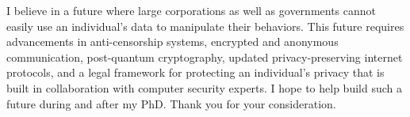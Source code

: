 \documentclass{article}
\begin{document}
I believe in a future where large corporations as well as governments cannot easily use an individual's data to manipulate their behaviors. This future requires advancements in anti-censorship systems, encrypted and anonymous communication, post-quantum cryptography, updated privacy-preserving internet protocols, and a legal framework for protecting an individual's privacy that is built in collaboration with computer security experts. I hope to help build such a future during and after my PhD. Thank you for your consideration.


% 

\vspace{0.1cm}

\def\notesname{\small{Footnotes \& References}}
\theendnotes
\end{document}
